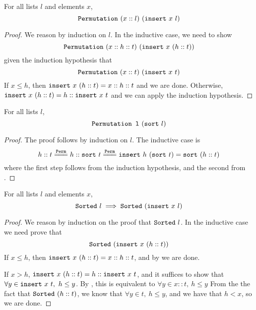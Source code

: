 \documentclass[sigplan,10pt,anonymous,review]{thesis}
\begin{document}


\begin{lemma}
  For all lists $l$ and elements $x$,
  \begin{equation*}
    \texttt{Permutation}~(x::l)~(\texttt{insert}~x~l)
  \end{equation*}
\end{lemma}
\begin{proof}
  We reason by induction on $l$. In the inductive case, we need to show
  \begin{equation*}
    \texttt{Permutation}~(x::h::t)~(\texttt{insert}~x~(h::t))
  \end{equation*}
  given the induction hypothesis that
  \begin{equation*}
    \texttt{Permutation}~(x::t)~(\texttt{insert}~x~t)
  \end{equation*}
  If $x \le h$, then $\texttt{insert}~x~(h::t) = x :: h :: t$ and we are
  done. Otherwise, $\texttt{insert}~x~(h::t) = h :: \texttt{insert}~x~t$ and
  we can apply the induction hypothesis.
\end{proof}

\begin{theorem}
  For all lists $l$,
  \begin{equation*}
    \texttt{Permutation~l}~(\texttt{sort}~l)
  \end{equation*}
\end{theorem}
\begin{proof}
  The proof follows by induction on $l$. The inductive case is
  \begin{equation*}
    h :: t \eqperm h :: \var{sort}~t \eqperm
    \var{insert}~h~(\var{sort}~t) = \var{sort}~(h :: t)
  \end{equation*}
  where the first step follows from the induction hypothesis, and the
  second from .
\end{proof}

\begin{lemma}
  For all lists $l$ and elements $x$,
  \begin{equation*}
    \texttt{Sorted}~l \implies \texttt{Sorted}~(\texttt{insert}~x~l)
  \end{equation*}
\end{lemma}
\begin{proof}
  We reason by induction on the proof that $\texttt{Sorted}~l$. In the
  inductive case we need prove that
  \begin{equation*}
    \texttt{Sorted}~(\texttt{insert}~x~(h::t))
  \end{equation*}
  If $x \le h$, then $\texttt{insert}~x~(h::t) = x :: h :: t$, and by
   we are done.

  If $x > h$, $\texttt{insert}~x~(h::t) = h :: \texttt{insert}~x~t$, and it
  suffices to show that $\forall y \in \texttt{insert}~x~t,~h \le y$. By
  , this is equivalent to $\forall y \in x::t,~h \le y$ From
  the the fact that $\texttt{Sorted}~(h::t)$, we know that $\forall y \in t,~h \le
  y$, and we have that $h < x$, so we are done.
\end{proof}
\end{document}
